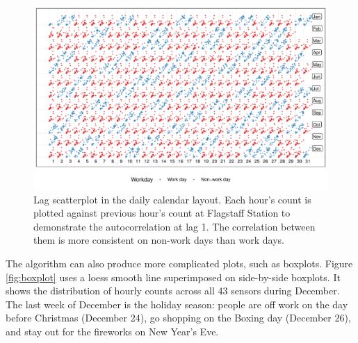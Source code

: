 \documentclass[12pt]{article}
\begin{document}
\begin{figure}

{\centering \includegraphics[width=\textwidth]{figure/scatterplot-1} 

}

\caption{Lag scatterplot in the daily calendar layout. Each hour's count is plotted against previous hour's count at Flagstaff Station to demonstrate the autocorrelation at lag 1. The correlation between them is more consistent on non-work days than work days.}\label{fig:scatterplot}
\end{figure}



The algorithm can also produce more complicated plots, such as boxplots. Figure \ref{fig:boxplot} uses a loess smooth line \citep{cleveland1979loess} superimposed on side-by-side boxplots. It shows the distribution of hourly counts across all 43 sensors during December. The last week of December is the holiday season: people are off work on the day before Christmas (December 24), go shopping on the Boxing day (December 26), and stay out for the fireworks on New Year's Eve.
\end{document}
